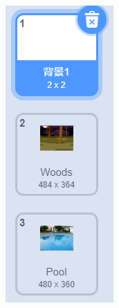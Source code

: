 \documentclass[10pt, a4paper]{article}
\begin{document}
\begin{enumerate}
        \begin{figure}[htbp]
            \centering
            \begin{minipage}[t]{.08\textwidth}
                \centering
                \includegraphics[width=\textwidth]{27.png}

\end{minipage}
\end{figure}
\end{enumerate}
\end{document}
